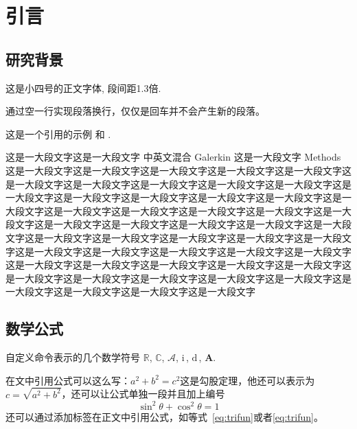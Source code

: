 \documentclass{shnuthesis}
\newcommand{\CC}{\ensuremath{\mathbb{C}}}
\newcommand{\RR}{\ensuremath{\mathbb{R}}}
\newcommand{\A}{\mathcal{A}}
\newcommand{\ii}{\bm{\mathrm{i}}\,}  %
\newcommand{\md}{\mathrm{d}\,}
\newcommand{\bA}{\boldsymbol{A}}
\begin{document}
    \maketoc[pagenumtoc]


	\clearpage %



\chapter{引言}

\section{研究背景}
这是小四号的正文字体, 段间距1.3倍.
	
通过空一行实现段落换行，仅仅是回车并不会产生新的段落。

这是一个引用的示例 \cite{Adams1975}和 \cite{Shen1994,Tadmor2012}.

这是一大段文字这是一大段文字 中英文混合 Galerkin 这是一大段文字 Methods 这是一大段文字这是一大段文字这是一大段文字这是一大段文字这是一大段文字这是一大段文字这是一大段文字这是一大段文字这是一大段文字这是一大段文字这是一大段文字这是一大段文字这是一大段文字这是一大段文字这是一大段文字这是一大段文字这是一大段文字这是一大段文字这是一大段文字这是一大段文字这是一大段文字这是一大段文字这是一大段文字这是一大段文字这是一大段文字这是一大段文字这是一大段文字这是一大段文字这是一大段文字这是一大段文字这是一大段文字这是一大段文字这是一大段文字这是一大段文字这是一大段文字这是一大段文字这是一大段文字这是一大段文字这是一大段文字这是一大段文字这是一大段文字这是一大段文字这是一大段文字这是一大段文字这是一大段文字这是一大段文字这是一大段文字这是一大段文字这是一大段文字这是一大段文字


\section{数学公式}

自定义命令表示的几个数学符号 $\RR$, $\CC$, $\A$, $\ii$, $\md$, $\bA$.

在文中引用公式可以这么写：$a^2+b^2=c^2$这是勾股定理，他还可以表示为$c=\sqrt{a^2+b^2}$，还可以让公式单独一段并且加上编号
\begin{equation}\label{eq:trifun}
\sin^2{\theta}+\cos^2{\theta}=1
\end{equation}
还可以通过添加标签在正文中引用公式，如等式~\eqref{eq:trifun}或者\ref{eq:trifun}。
\end{document}

